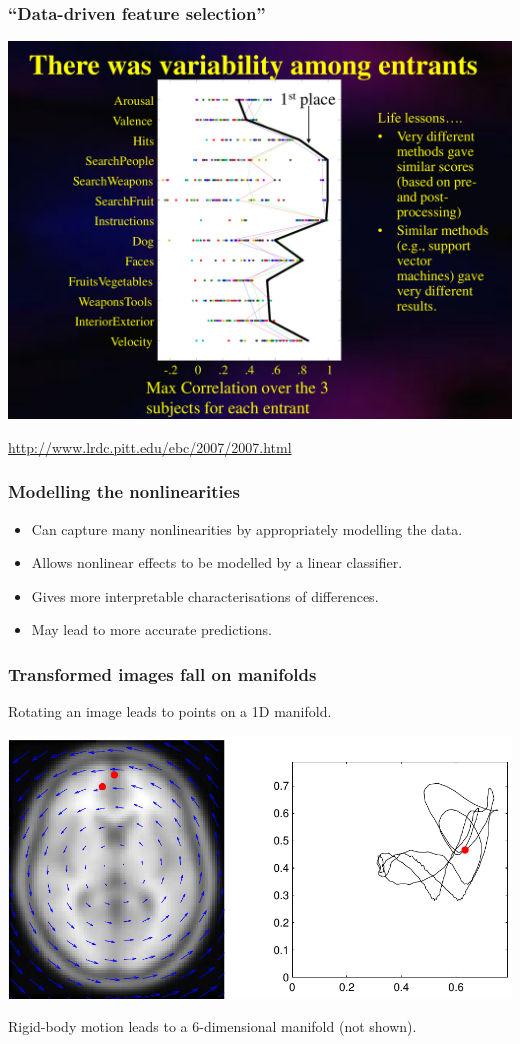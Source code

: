 \begin{frame}
\frametitle{``Data-driven feature selection''}
\begin{center}
\includegraphics[height=0.5\textwidth]{pbaic2007_2}\par
\url{http://www.lrdc.pitt.edu/ebc/2007/2007.html}\par
\end{center}
\end{frame}




\begin{frame}
\frametitle{Modelling the nonlinearities}
\begin{itemize}
\item Can capture many nonlinearities by appropriately modelling the data.
\item Allows nonlinear effects to be modelled by a linear classifier.
\item Gives more interpretable characterisations of differences.
\item May lead to more accurate predictions.
\end{itemize}
\end{frame}

\begin{frame}
\frametitle{Transformed images fall on manifolds}
Rotating an image leads to points on a 1D manifold.\par
\includegraphics[width=\textwidth]{manifold_rotation}

Rigid-body motion leads to a 6-dimensional manifold (not shown).

\end{frame}


